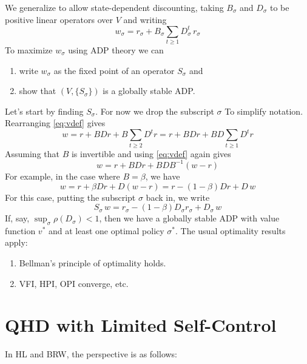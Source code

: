 \documentclass[12pt, reqno]{amsart}
\renewcommand{\geq}{\geqslant}
\newcommand{\1}{\mathbbm 1}
\theoremstyle{plain}
\theoremstyle{definition}
\begin{document}
We generalize to allow state-dependent discounting, taking $B_\sigma$ and
$D_\sigma$ to be
positive linear operators over $V$ and writing
%
\begin{equation}\label{eq:vdef}
    w_\sigma = r_\sigma + B_\sigma \sum_{t \geq 1} D_\sigma^t \, r_\sigma
\end{equation}
%
To maximize $w_\sigma$ using ADP theory we can
%
\begin{enumerate}
    \item write $w_\sigma$ as the fixed point of an operator $S_\sigma$ and
    \item show that $(V, \{S_\sigma\})$ is a globally stable ADP.
\end{enumerate}
%
Let's start by finding $S_\sigma$.  For now we drop the subscript $\sigma$ To
simplify notation. Rearranging \eqref{eq:vdef} gives
%
\begin{equation*}
    w 
    = r + B D r + B \sum_{t \geq 2} D^t r
    = r + B D r + B D \sum_{t \geq 1} D^t r
\end{equation*}
%
Assuming that $B$ is invertible and using \eqref{eq:vdef} again gives
%
\begin{equation*}
    w 
    = r + B D r + B D B^{-1} (w - r)
\end{equation*}
%
For example, in the case where $B= \beta$, we have
%
\begin{equation*}
    w 
    = r + \beta D r + D (w - r)
    = r - (1 - \beta) D r + D \, w
\end{equation*}
%
For this case, putting the subscript $\sigma$ back in, we write
%
\begin{equation*}
    S_\sigma \, w = r_\sigma - (1 - \beta) D_\sigma r_\sigma + D_\sigma \, w
\end{equation*}
%
If, say, $\sup_\sigma \rho(D_\sigma) < 1$, then we have a globally stable ADP
with value function $v^*$ and at least one optimal policy $\sigma^*$.  The usual
optimality results apply:

\begin{enumerate}
    \item Bellman's principle of optimality holds.
    \item VFI, HPI, OPI converge, etc.
\end{enumerate}


\section{QHD with Limited Self-Control}

In HL and BRW, the perspective is as follows: 
\end{document}
